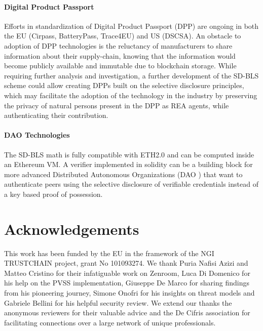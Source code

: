 \paragraph{Digital Product Passport}
Efforts in standardization of Digital Product Passport (DPP) are
ongoing in both the EU (Cirpass, BatteryPass, Trace4EU) and US
(DSCSA). An obstacle to adoption of DPP technologies is the reluctancy
of manufacturers to share information about their supply-chain,
knowing that the information would become publicly available and
immutable due to blockchain storage. While requiring further analysis
and investigation, a further development of the SD-BLS scheme could
allow creating DPPs built on the selective disclosure principles,
which may facilitate the adoption of the technology in the industry by
preserving the privacy of natural persons present in the DPP as REA
agents\cite{reflow}, while authenticating their contribution.

\paragraph{DAO Technologies}
The SD-BLS math is fully compatible with ETH2.0 and can be computed
inside an Ethereum VM. A verifier implemented in solidity can be a
building block for more advanced Distributed Autonomous Organizations
(DAO \cite{dao}) that want to authenticate peers using the selective
disclosure of verifiable credentials instead of a key based proof of
possession.


\section{Acknowledgements}
This work has been funded by the EU in the framework of the NGI
TRUSTCHAIN project, grant No 101093274. We thank Puria Nafisi Azizi
and Matteo Cristino for their infatiguable work on Zenroom, Luca Di
Domenico for his help on the PVSS implementation, Giuseppe De Marco
for sharing findings from his pioneering journey, Simone Onofri for
his insights on threat models and Gabriele Bellini for his helpful
security review. We extend our thanks the anonymous reviewers for
their valuable advice and the De Cifris association for facilitating
connections over a large network of unique professionals.





